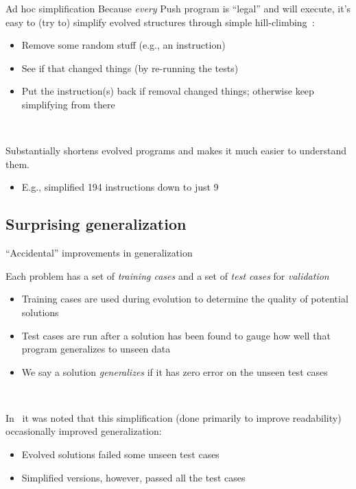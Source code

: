 \documentclass{beamer}
\begin{document}
\begin{frame}{Ad hoc simplification}
Because \emph{every} Push program is ``legal'' and will execute, it's easy to (try to) simplify evolved structures through simple hill-climbing~\cite{Spector:2014:GECCOcomp}:
\begin{itemize}
	\item Remove some random stuff (e.g., an instruction)
	\item See if that changed things (by re-running the tests)
	\item Put the instruction(s) back if removal changed things; otherwise keep simplifying from there
\end{itemize}
 
 ~
 
 Substantially shortens evolved programs and makes it much easier to
 understand them.
 \begin{itemize}
 	\item E.g., simplified 194 instructions down to just 9
 \end{itemize}
\end{frame}

\subsection{Surprising generalization}

\begin{frame}{``Accidental'' improvements in generalization}

Each problem has a set of \emph{training cases} and a set of \emph{test cases} for \emph{validation}~\cite{Helmuth:2015:GECCO}
\begin{itemize}
	\item Training cases are used during evolution to determine the quality of potential solutions
	\item Test cases are run after a solution has been found to gauge how well that program generalizes to unseen data
	\item We say a solution \emph{generalizes} if it has zero error on the unseen test cases
\end{itemize}

~

In~\cite{Helmuth:2015:dissertation} it was noted that this simplification (done primarily to improve readability) occasionally improved generalization:
\begin{itemize}
	\item Evolved solutions failed some unseen test cases
	\item Simplified versions, however, passed all the test cases
\end{itemize}


\end{frame}
\end{document}
